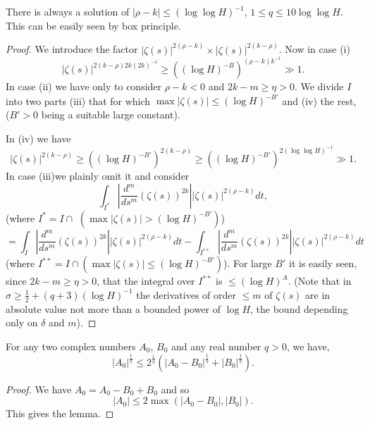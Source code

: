 \begin{remark*}
There is always a solution of $|\rho - k| \leq (\log \log H)^{-1}$, $1 \leq q \leq 10 \log \log H$. This can be easily seen by box principle.
\end{remark*}

\begin{proof}
We introduce the factor $|\zeta(s)|^{2(\rho - k)} \times |\zeta(s)|^{2(k-\rho)}$. Now in case (i)
$$
|\zeta(s)|^{2(k-\rho) 2k (2k)^{-1}} \geq ((\log H)^{-B})^{(\rho  - k)k^{-1}} \gg 1. 
$$
In case (ii) we have only to consider $\rho - k < 0$ and $2k - m \geq \eta >0$. We divide $I$ into two parts (iii) that for which $\max |\zeta(s)| \leq (\log H)^{-B'}$ and (iv) the rest, ($B'>0$ being a suitable large constant).

In (iv) we have
$$
|\zeta(s)|^{2(k-\rho)} \geq ((\log H)^{-B'})^{2(k-\rho)} \geq ((\log H)^{-B'})^{2(\log \log H)^{-1}} \gg  1. 
$$
In case (iii)\pageoriginale  we plainly omit it and consider
$$
\int_{I^*}  |\frac{d^m}{ds^m} (\zeta(s))^{2k} || \zeta(s)|^{2(\rho -k)} dt,
$$
(where $I^* = I \cap $ $(\max |\zeta(s)| > (\log H)^{-B'})$)
$$
=\int_I |\frac{d^m}{ds^m} (\zeta(s))^{2k} || \zeta(s)|^{2(\rho - k)} dt - \int_{I^{**}} |\frac{d^m}{ds^m} (\zeta(s))^{2k} || \zeta(s)|^{2(\rho -k)} dt
$$
(where $I^{**} = I \cap (\max |\zeta(s)| \leq (\log H)^{-B'})$). For large $B'$ it is easily seen, since $2k-m\geq \eta > 0$, that the integral over $I^{**}$ is $\leq (\log H)^A$. (Note that in $\sigma \geq \frac{1}{2} + (q+3) (\log H)^{-1}$ the derivatives of order $\leq m$ of $\zeta(s)$ are in absolute value not more than a bounded power of $\log H$, the bound depending only on $\delta$ and $m$).
\end{proof}


\begin{lem}\label{c4:lem6}
For any two complex numbers $A_0$, $B_0$ and any real number $q>0$, we have,
\begin{equation*}
|A_0|^{\frac{1}{q}} \leq 2^{\frac{1}{q}} \left(|A_0 - B_0|^{\frac{1}{q}} + |B_0|^{\frac{1}{q}} \right).
\tag{4.2.6}\label{c4:eq4.2.6}
\end{equation*}
\end{lem}

\begin{proof}
We have $A_0 = A_0 -B_0 + B_0$ and so
$$
|A_0| \leq 2 \max (|A_0 -B_0|, |B_0|). 
$$
This gives the lemma.
\end{proof}

